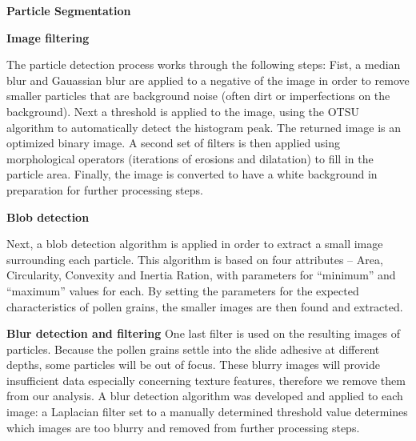 \textbf{Particle Segmentation} 


\textbf{Image filtering}

The particle detection process works through the following steps: Fist, a median blur and Gauassian blur are applied to a negative of the image in order to remove smaller particles that are background noise (often dirt or imperfections on the background). 
Next a threshold is applied to the image, using the OTSU algorithm to automatically detect the histogram peak. The returned image is an optimized binary image. A second set of filters is then applied using morphological operators (iterations of erosions and dilatation) to fill in the particle area. Finally, the image is converted to have a white background in preparation for further processing steps.


\textbf{Blob detection}

Next, a blob detection algorithm is applied in order to extract a small image surrounding each particle. This algorithm is based on four attributes – Area, Circularity, Convexity and Inertia Ration, with parameters for “minimum” and “maximum” values for each. By setting the parameters for the expected characteristics of pollen grains, the smaller images are then found and extracted.

\textbf{Blur detection and filtering}
One last filter is used on the resulting images of particles. Because the pollen grains settle into the slide adhesive at different depths, some particles will be out of focus. These blurry images will provide insufficient data especially concerning texture features, therefore we remove them from our analysis. A blur detection algorithm was developed and applied to each image: a Laplacian filter set to a manually determined threshold value determines which images are too blurry and removed from further processing steps. 

    
    
    
    
  
  
  